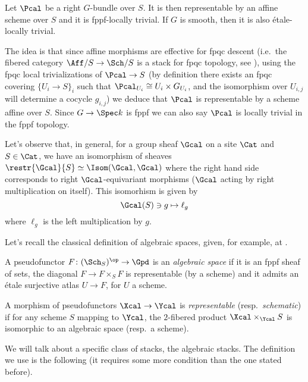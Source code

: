         \begin{prop}
            \label{prop:g_bundle_affine_trivial}
            Let $\Pcal$ be a right $G$-bundle over $S$. It is then representable by an affine scheme over $S$ and it is fppf-locally trivial. If $G$ is smooth, then it is also étale-locally trivial.
        \end{prop}
        The idea is that since affine morphisms are effective for fpqc descent (i.e.\ the fibered category $\Aff/S \to \Sch/S$ is a stack for fpqc topology, see \cite[Thm~4.33]{Vist:desc}), using the fpqc local trivializations of $\Pcal \to S$ (by definition there exists an fpqc covering $\{U_i \to S\}_i$ such that $\Pcal_{U_i} \cong U_i \times G_{U_i}$, and the isomorphism over $U_{i,j}$ will determine a cocycle $g_{i,j}$) we deduce that $\Pcal$ is representable by a scheme affine over $S$. Since $G \to \Spec k$ is fppf we can also say $\Pcal$ is locally trivial in the fppf topology. 

        Let's observe that, in general, for a group sheaf $\Gcal$ on a site $\Cat$ and $S \in \Cat$, we have an isomorphism of sheaves $\restr{\Gcal}{S} \simeq \Isom(\Gcal, \Gcal)$ where the right hand side corresponds to right $\Gcal$-equivariant morphisms ($\Gcal$ acting by right multiplication on itself). This isomorhism is given by \[\Gcal(S) \ni g \mapsto \ell_g\] where $\ell_g$ is the left multiplication by $g$.


        Let's recall the classical definition of algebraic spaces, given, for example, at \cite[\href{https://stacks.math.columbia.edu/tag/025Y}{Definition 025Y}]{stacks-project}. 
        \begin{defn}
            \label{defn:algebraic_space}
            A pseudofunctor $F\colon (\Sch_S)^{\op} \to \Gpd$ is an \emph{algebraic space} if it is an fppf sheaf of sets, the diagonal $F \to F \times_S F$ is representable (by a scheme) and it admits an étale surjective atlas $U \to F$, for $U$ a scheme.
        \end{defn}
        \begin{defn}
            \label{defn:representable_pseudofunctor} 
            A morphism of pseudofunctors $\Xcal \to \Ycal$ is \emph{representable} (resp.\ \emph{schematic}) if for any scheme $S$ mapping to $\Ycal$, the $2$-fibered product $\Xcal \times_{\Ycal} S$ is isomorphic to an algebraic space (resp.\ a scheme).
        \end{defn}
        
        We will talk about a specific class of stacks, the algebraic stacks.
        The definition we use is the following (it requires some more condition than the one stated before).

